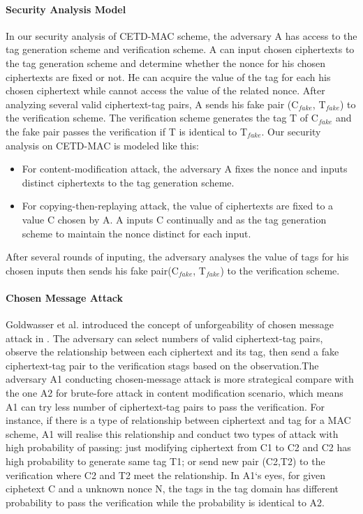 \documentclass{article}
\begin{document}
\paragraph{Security Analysis Model}
In our security analysis of CETD-MAC scheme, the adversary A has access to the tag generation scheme and verification scheme. A can input chosen ciphertexts to the tag generation scheme and determine whether the nonce for his chosen ciphertexts are fixed or not. He can acquire the value of the tag for each his chosen ciphertext while cannot access the value of the related nonce. After analyzing several valid ciphertext-tag pairs, A sends his fake pair (C$_{fake}$, T$_{fake}$) to the verification scheme. The verification scheme generates the tag T of C$_{fake}$ and the fake pair passes the verification if T is identical to T$_{fake}$. Our security analysis on CETD-MAC is modeled like this:
\begin{itemize}
	\item For content-modification attack, the adversary A fixes the nonce and inputs distinct ciphertexts to the tag generation scheme. 	
	\item For copying-then-replaying attack, the value of ciphertexts are fixed to a value C chosen by A. A inputs C continually and as the tag generation scheme to maintain the nonce distinct for each input.    
\end{itemize}
After several rounds of inputing, the adversary analyses the value of tags for his chosen inputs then sends his fake pair(C$_{fake}$, T$_{fake}$) to the verification scheme.   	



\paragraph{Chosen Message Attack}
Goldwasser et al. introduced the concept of unforgeability of chosen message attack in \cite{}. The adversary can select numbers of valid ciphertext-tag pairs, observe the relationship between each ciphertext and its tag, then send a fake ciphertext-tag pair to the verification stags based on the observation.The adversary A1 conducting chosen-message attack is more strategical compare with the one A2 for brute-fore attack in content modification scenario, which means A1 can try less number of ciphertext-tag pairs to pass the verification. 
For instance, if there is a type of relationship between ciphertext and tag for a MAC scheme, A1 will realise this relationship and conduct two types of attack with high probability of passing: just modifying ciphertext from C1 to C2 and C2 has high probability to generate same tag T1; or send new pair (C2,T2) to the verification where C2 and T2 meet the relationship. In A1`s eyes, for given ciphetext C and a unknown nonce N, the tags in the tag domain has different probability to pass the verification while the probability is identical to A2. 
\end{document}
